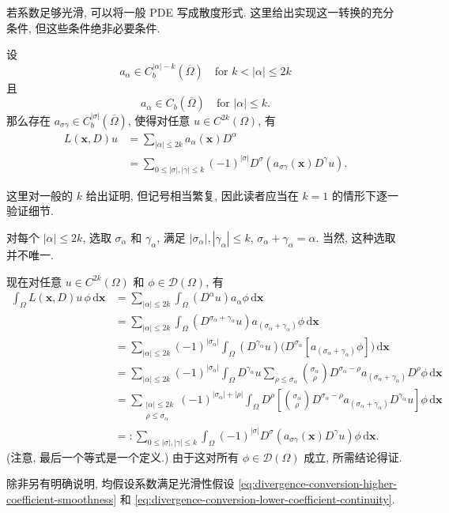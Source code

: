 若系数足够光滑, 可以将一般 PDE 写成散度形式. 这里给出实现这一转换的充分条件, 但这些条件绝非必要条件.

\begin{Lemma}
\label{lem:smooth-coefficients-divergence-conversion}
设
\begin{equation}\label{eq:divergence-conversion-higher-coefficient-smoothness}
a_\alpha\in C_b^{|\alpha|-k}(\overline\Omega)\quad\text{for }k<|\alpha|\leq2k
\end{equation}
且
\begin{equation}\label{eq:divergence-conversion-lower-coefficient-continuity}
a_\alpha\in C_b(\overline\Omega)\quad\text{for }|\alpha|\leq k.
\end{equation}
那么存在 $a_{\sigma\gamma}\in C_b^{|\sigma|}(\overline\Omega)$, 使得对任意 $u\in C^{2k}(\Omega)$, 有\[\begin{aligned}
L(\bm{x},D)u&=\sum_{|\alpha|\leq2k}a_\alpha(\bm{x})D^\alpha\\
&=\sum_{0\leq|\sigma|,|\gamma|\leq k}(-1)^{|\sigma|}D^\sigma(a_{\sigma\gamma}(\bm{x})D^\gamma u).
\end{aligned}\]
\end{Lemma}

\begin{Proof}
这里对一般的 $k$ 给出证明, 但记号相当繁复, 因此读者应当在 $k=1$ 的情形下逐一验证细节.

对每个 $|\alpha|\leq2k$, 选取 $\sigma_\alpha$ 和 $\gamma_\alpha$, 满足 $|\sigma_\alpha|,|\gamma_\alpha|\leq k$, $\sigma_\alpha+\gamma_\alpha=\alpha$. 当然, 这种选取并不唯一.

现在对任意 $u\in C^{2k}(\Omega)$ 和 $\phi\in\mathcal{D}(\Omega)$, 有\[\begin{aligned}
\int_\Omega L(\bm{x},D)u\,\phi\,\mathrm{d}\bm{x}
&=\sum_{|\alpha|\leq2k}\int_\Omega(D^\alpha u)a_\alpha\phi\,\mathrm{d}\bm{x}\\
&=\sum_{|\alpha|\leq2k}\int_\Omega(D^{\sigma_\alpha+\gamma_\alpha}u)a_{(\sigma_\alpha+\gamma_\alpha)}\phi\,\mathrm{d}\bm{x}\\
&=\sum_{|\alpha|\leq2k}(-1)^{|\sigma_\alpha|}\int_\Omega(D^{\gamma_\alpha}u)\bigl(D^{\sigma_\alpha}[a_{(\sigma_\alpha+\gamma_\alpha)}\phi]\bigr)\,\mathrm{d}\bm{x}\\
&=\sum_{|\alpha|\leq2k}(-1)^{|\sigma_\alpha|}\int_\Omega D^{\gamma_\alpha}u
\sum_{\rho\leq\sigma_\alpha}\binom{\sigma_\alpha}{\rho}D^{\sigma_\alpha-\rho}a_{(\sigma_\alpha+\gamma_\alpha)}D^\rho\phi\,\mathrm{d}\bm{x}\\
&=\sum_{\substack{|\alpha|\leq2k\\\rho\leq\sigma_\alpha}}(-1)^{|\sigma_\alpha|+|\rho|}\int_\Omega
D^\rho\left[\binom{\sigma_\alpha}{\rho}D^{\sigma_\alpha-\rho}a_{(\sigma_\alpha+\gamma_\alpha)}D^{\gamma_\alpha}u\right]\phi\,\mathrm{d}\bm{x}\\
&=: \sum_{0\leq|\sigma|,|\gamma|\leq k}\int_\Omega(-1)^{|\sigma|}D^\sigma(a_{\sigma\gamma}(\bm{x})D^\gamma u)\phi\,\mathrm{d}\bm{x}.
\end{aligned}\](注意, 最后一个等式是一个定义.) 由于这对所有 $\phi\in\mathcal{D}(\Omega)$ 成立, 所需结论得证.
\end{Proof}

\begin{Remark}
\label{rem:standing-elliptic-coefficient-smoothness}
除非另有明确说明, 均假设系数满足光滑性假设 \eqref{eq:divergence-conversion-higher-coefficient-smoothness} 和 \eqref{eq:divergence-conversion-lower-coefficient-continuity}.
\end{Remark}
